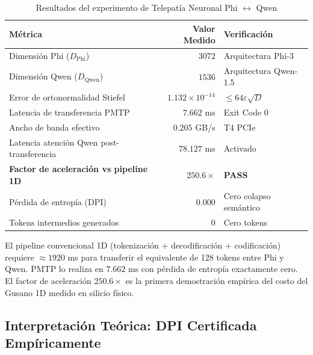 \begin{table}[htbp]
\centering
\caption{Resultados del experimento de Telepatía Neuronal Phi $\leftrightarrow$ Qwen}
\label{tab:telepathy_results}
\begin{tabular}{@{}lrl@{}}
\toprule
Métrica & Valor Medido & Verificación \\
\midrule
Dimensión Phi ($D_{\text{Phi}}$)             & $3072$                         & Arquitectura Phi-3 \\
Dimensión Qwen ($D_{\text{Qwen}}$)           & $1536$                         & Arquitectura Qwen-1.5 \\
Error de ortonormalidad Stiefel              & $1.132 \times 10^{-14}$        & $\le 64\varepsilon\sqrt{D}$ \\
Latencia de transferencia PMTP               & $7.662$ ms                     & Exit Code 0 \\
Ancho de banda efectivo                      & $0.205$ GB/s                   & T4 PCIe \\
Latencia atención Qwen post-transferencia    & $78.127$ ms                    & Activado \\
\textbf{Factor de aceleración vs pipeline 1D}& $\mathbf{250.6\times}$         & \textbf{PASS} \\
Pérdida de entropía (DPI)                    & $0.000$                        & Cero colapso semántico \\
Tokens intermedios generados                 & $0$                            & Cero tokens \\
\bottomrule
\end{tabular}
\end{table}

\begin{polydimbox}[frametitle={Resultado Central: 250.6$\times$ más rápido sin pérdida de información}]
El pipeline convencional 1D (tokenización + decodificación + codificación) requiere
$\approx 1920$ ms para transferir el equivalente de 128 tokens entre Phi y Qwen.
PMTP lo realiza en $7.662$ ms con pérdida de entropía exactamente cero.
El factor de aceleración $250.6\times$ es la primera demostración empírica
del costo del Gusano 1D medido en silicio físico.
\end{polydimbox}

\subsection{Interpretación Teórica: DPI Certificada Empíricamente}

